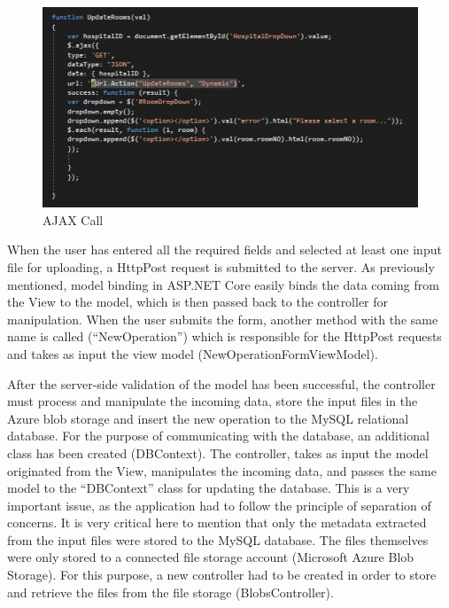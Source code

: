 \begin{figure}[!ht]
\begin{center}
\includegraphics[width=17cm]{imgs/ajax.jpg}
\end{center}\vspace{-0.3cm}
\caption[AJAX Call]{AJAX Call} \label{ajax}
\end{figure}

When the user has entered all the required fields and selected at least one input file for uploading, a HttpPost request is submitted to the server. As previously mentioned, model binding in ASP.NET Core easily binds the data coming from the View to the model, which is then passed back to the controller for manipulation. When the user submits the form, another method with the same name is called (``NewOperation'') which is responsible for the HttpPost requests and takes as input the view model (NewOperationFormViewModel).

After the server-side validation of the model has been successful, the controller must process and manipulate the incoming data, store the input files in the Azure blob storage and insert the new operation to the MySQL relational database. For the purpose of communicating with the database, an additional class has been created (DBContext). The controller, takes as input the model originated from the View, manipulates the incoming data, and passes the same model to the ``DBContext'' class for updating the database. This is a very important issue, as the application had to follow the principle of separation of concerns.
It is very critical here to mention that only the metadata extracted from the input files were stored to the MySQL database. The files themselves were only stored to a connected file storage account (Microsoft Azure Blob Storage). For this purpose, a new controller had to be created in order to store and retrieve the files from the file storage (BlobsController).

